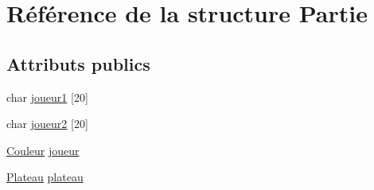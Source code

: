 \hypertarget{structPartie}{\section{\-Référence de la structure \-Partie}
\label{structPartie}
}
\subsection*{\-Attributs publics}
\begin{DoxyCompactItemize}
\item 
char \hyperlink{structPartie_a42905bbdce5ccfd367a1b4195a433e01}{joueur1} \mbox{[}20\mbox{]}
\item 
char \hyperlink{structPartie_a90dd0f2162050b2f3169dcb860d975cf}{joueur2} \mbox{[}20\mbox{]}
\item 
\hyperlink{couleur_8h_aa304d0ca681f782b1d7735da33037dd7}{\-Couleur} \hyperlink{structPartie_a8b5c0c007da53d6d723f4300a1d9d4ad}{joueur}
\item 
\hyperlink{plateau_8h_a200ab4b9e2219fb369612bcb1d40f9d5}{\-Plateau} \hyperlink{structPartie_ae8a9b67f286f8bfd3e3a574f0ac2ac67}{plateau}
\end{DoxyCompactItemize}


